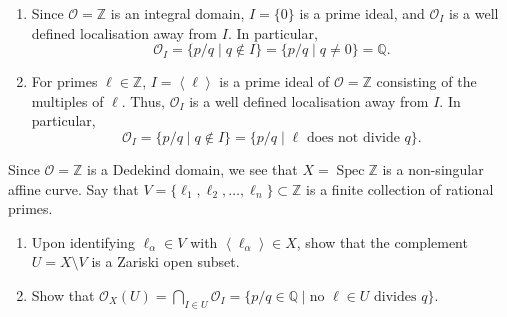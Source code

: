 \documentclass[12 pt, letterpaper]{hmcpset}
\begin{document}
\begin{solution}
	\begin{enumerate}
		\item Since $\mathcal{O} = \mathbb{Z}$ is an integral domain, $I = \{ 0 \}$ is a prime ideal, and $\mathcal{O}_{I}$ is a well defined localisation away from $I$. In particular,
			\[
				\mathcal{O}_{I} = \{ p / q \mid q \notin I \} = \{ p / q \mid q \neq 0 \} = \mathbb{Q}.
			\]
		\item For primes $\ell \in \mathbb{Z}$, $I = \left < \ell \right >$ is a prime ideal of $\mathcal{O} = \mathbb{Z}$ consisting of the multiples of $\ell$. Thus, $\mathcal{O}_{I}$ is a well defined localisation away from $I$. In particular,
			\[
				\mathcal{O}_{I} = \{ p / q \mid q \notin I \} = \{ p / q \mid \ell \text{ does not divide } q \}.
			\]
	\end{enumerate}
\end{solution}

\pagebreak

\begin{problem}[Problem 3.]
	Since $\mathcal{O} = \mathbb{Z}$ is a Dedekind domain, we see that $X = \operatorname{Spec} \mathbb{Z}$ is a non-singular affine curve. Say that $V = \{ \ell_{1}, \ell_{2}, \dots, \ell_{n} \} \subset \mathbb{Z}$ is a finite collection of rational primes.
	\begin{enumerate}
		\item Upon identifying $\ell_{\alpha} \in V$ with $\left < \ell_{\alpha} \right > \in X$, show that the complement $U = X \setminus V$ is a Zariski open subset.
		\item Show that $\mathcal{O}_{X}(U) = \bigcap_{I \in U} \mathcal{O}_{I} = \{ p / q \in \mathbb{Q} \mid \text{no } \ell \in U \text{ divides } q \}$.	
	\end{enumerate}
\end{problem}
\end{document}
